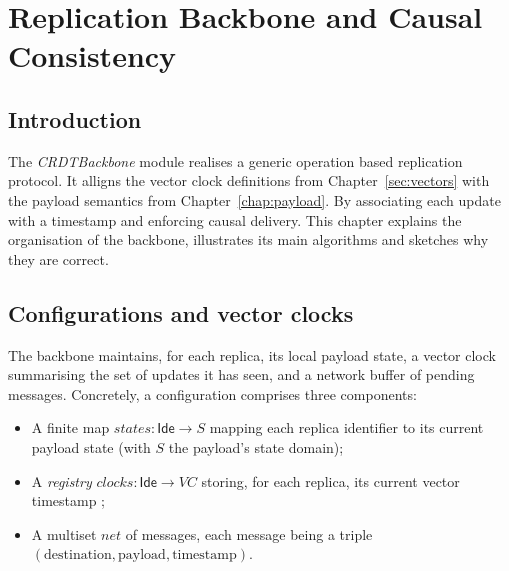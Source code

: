 

\newcommand{\AthenaCode}[2]{\lstset{style=athena, label={#1}, caption={#2}}}


\chapter{Replication Backbone and Causal Consistency}\label{chap:backbone}

\section{Introduction}

The \textit{CRDTBackbone} module realises a generic operation based replication protocol.  It alligns the vector clock definitions from Chapter~\ref{sec:vectors} with the payload semantics from Chapter~\ref{chap:payload}.  By associating each update with a timestamp and enforcing causal delivery. This chapter explains the organisation of the backbone, illustrates its main algorithms and sketches why they are correct.

\section{Configurations and vector clocks}

The backbone maintains, for each replica, its local payload state, a vector clock summarising the set of updates it has seen, and a network buffer of pending messages.  Concretely, a configuration comprises three components:
\begin{itemize}
  \item A finite map \(\mathit{states}:\mathsf{Ide}\to S\) mapping each replica identifier to its current payload state (with \(S\) the payload’s state domain);
  \item A \emph{registry} \(\mathit{clocks}:\mathsf{Ide}\to VC\) storing, for each replica, its current vector timestamp \cite{lamport1978time,fidge1988timestamps,mattern1989virtual};
  \item A multiset \(\mathit{net}\) of messages, each message being a triple \((\text{destination},\text{payload},\text{timestamp})\).
\end{itemize}

